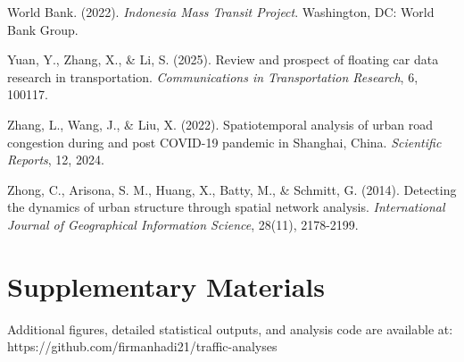 \documentclass[12pt,a4paper]{article}
\begin{document}
World Bank. (2022). \emph{Indonesia Mass Transit Project}. Washington, DC: World Bank Group.

Yuan, Y., Zhang, X., \& Li, S. (2025). Review and prospect of floating car data research in transportation. \emph{Communications in Transportation Research}, 6, 100117.

Zhang, L., Wang, J., \& Liu, X. (2022). Spatiotemporal analysis of urban road congestion during and post COVID-19 pandemic in Shanghai, China. \emph{Scientific Reports}, 12, 2024.

Zhong, C., Arisona, S. M., Huang, X., Batty, M., \& Schmitt, G. (2014). Detecting the dynamics of urban structure through spatial network analysis. \emph{International Journal of Geographical Information Science}, 28(11), 2178-2199.



\section*{Supplementary Materials}

Additional figures, detailed statistical outputs, and analysis code are available at: https://github.com/firmanhadi21/traffic-analyses
\end{document}
